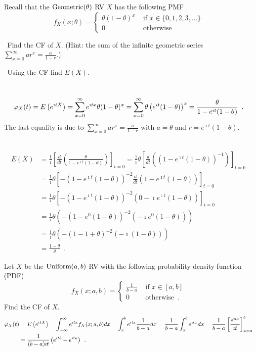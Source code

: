 \begin{ExerciseList}
\Exercise
Recall that the $\mbox{{\rm Geometric}}(\theta)$ RV $X$ has the following PMF
\[
f_X(x;\theta) = 
\begin{cases}
\theta (1-\theta)^x & \text{ if } x \in \{0,1,2,3,\ldots\}\\
0 & \text{ otherwise}
\end{cases}
\]
\be
\item~Find the CF of $X$. (Hint: the sum of the infinite geometric series $\sum_{x=0}^{\infty} a r^x = \frac{a}{1-r}$.)
\item~Using the CF find $E(X)$.
\ee
\Answer
~\\
\be
\item~
\[
\varphi_X(t) = E \left(e^{\imath t X}\right) = \sum_{x=0}^{\infty} e^{\imath t x}\theta(1-\theta)^x
= \sum_{x=0}^{\infty} \theta \left(e^{\imath t} (1-\theta)\right)^x = \frac{\theta}{1-e^{\imath t} (1-\theta)} \enspace .
\]
The last equality is due to $\sum_{x=0}^{\infty} a r^x = \frac{a}{1-r}$ with $a=\theta$ and $r=e^{\imath t} (1-\theta)$.
\item~
\begin{align*}
E(X)
&= \frac{1}{\imath} \left[ \frac{d}{dt} \left( \frac{\theta}{1-e^{\imath t}(1-\theta)} \right) \right]_{t=0} 
=  \frac{1}{\imath} \theta \left[ \frac{d}{dt} \left( \left(1-e^{\imath t}(1-\theta)\right)^{-1} \right) \right]_{t=0} \\
&= \frac{1}{\imath} \theta \left[ -\left(1-e^{\imath t} (1-\theta)\right)^{-2} \frac{d}{dt} \left( 1-e^{\imath t}(1-\theta)\right) \right]_{t=0}\\ 
&= \frac{1}{\imath} \theta \left[ -\left(1-e^{\imath t} (1-\theta)\right)^{-2} \left( 0-\imath e^{\imath t}(1-\theta)\right) \right]_{t=0}\\
&= \frac{1}{\imath} \theta \left( -\left(1-e^{0} (1-\theta)\right)^{-2} \left( -\imath e^{0}(1-\theta)\right) \right)\\ 
&= \frac{1}{\imath} \theta \left( -\left(1- 1+\theta\right)^{-2} \left( -\imath (1-\theta)\right) \right)\\
&=\frac{1-\theta}{\theta} \enspace .
\end{align*}
\ee

\Exercise
Let $X$ be the $\mbox{{\rm Uniform}}(a,b)$ RV with the following probability density function (PDF)
\[
f_X(x; a,b) = 
\begin{cases}
\frac{1}{b-a} & \text{ if } x \in [a,b] \\
0 & \text{ otherwise} \enspace.
\end{cases}
\]
Find the CF of $X$.
\Answer
~\\
\begin{align*}
\varphi_X(t) 
&= E\left( e^{\imath t X} \right) 
= \int_{-\infty}^{\infty} e^{\imath t x} f_X(x;a,b) dx
= \int_{a}^{b} e^{\imath t x} \frac{1}{b-a} dx
= \frac{1}{b-a} \int_{a}^{b} e^{\imath t x} dx
= \frac{1}{b-a} \left[ \frac{e^{\imath t x}}{\imath t} \right]_{x=a}^b\\
&=  \frac{1}{(b-a)\imath t} \left( e^{\imath t b} - e^{\imath t a}\right) \enspace .
\end{align*}


\end{ExerciseList}
